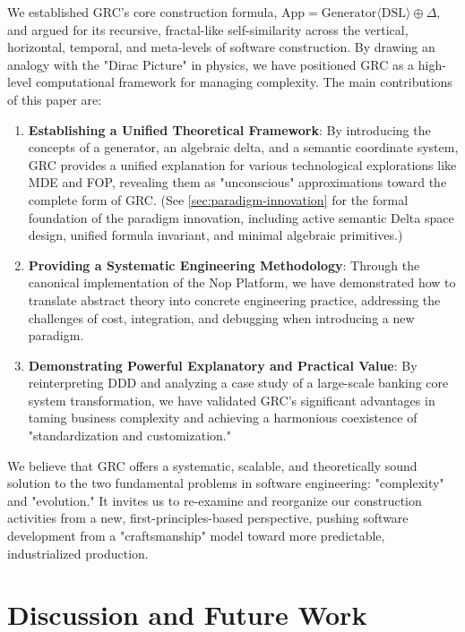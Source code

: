 \documentclass[11pt]{article}
\begin{document}
We established GRC's core construction formula, $\text{App} = \text{Generator}\langle\text{DSL}\rangle \oplus \Delta$, and argued for its recursive, fractal-like self-similarity across the vertical, horizontal, temporal, and meta-levels of software construction. By drawing an analogy with the "Dirac Picture" in physics, we have positioned GRC as a high-level computational framework for managing complexity. The main contributions of this paper are:

\begin{enumerate}
    \item \textbf{Establishing a Unified Theoretical Framework}: By introducing the concepts of a generator, an algebraic delta, and a semantic coordinate system, GRC provides a unified explanation for various technological explorations like MDE and FOP, revealing them as "unconscious" approximations toward the complete form of GRC. (See \autoref{sec:paradigm-innovation} for the formal foundation of the paradigm innovation, including active semantic Delta space design, unified formula invariant, and minimal algebraic primitives.)
    \item \textbf{Providing a Systematic Engineering Methodology}: Through the canonical implementation of the Nop Platform, we have demonstrated how to translate abstract theory into concrete engineering practice, addressing the challenges of cost, integration, and debugging when introducing a new paradigm.
    \item \textbf{Demonstrating Powerful Explanatory and Practical Value}: By reinterpreting DDD and analyzing a case study of a large-scale banking core system transformation, we have validated GRC's significant advantages in taming business complexity and achieving a harmonious coexistence of "standardization and customization."
\end{enumerate}

We believe that GRC offers a systematic, scalable, and theoretically sound solution to the two fundamental problems in software engineering: "complexity" and "evolution." It invites us to re-examine and reorganize our construction activities from a new, first-principles-based perspective, pushing software development from a "craftsmanship" model toward more predictable, industrialized production.

\section{Discussion and Future Work}
\end{document}

